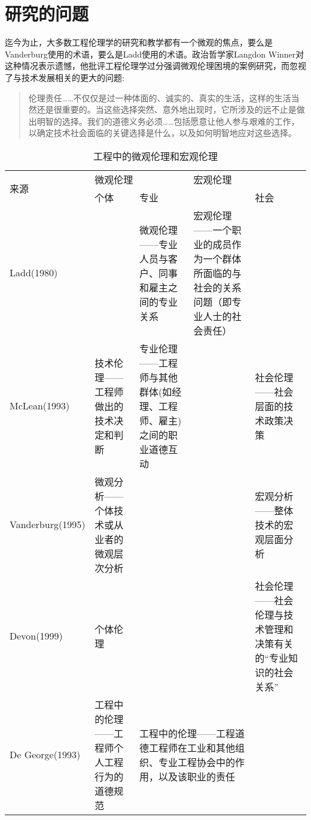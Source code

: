 \documentclass[lang=cn,11pt,a4paper]{elegantpaper}
\begin{document}
\section{研究的问题}
迄今为止，大多数工程伦理学的研究和教学都有一个微观的焦点，要么是Vanderburg使用的术语，要么是Ladd使用的术语。政治哲学家Langdon Winner\cite[p. 62]{8}对这种情况表示遗憾，他批评工程伦理学过分强调微观伦理困境的案例研究，而忽视了与技术发展相关的更大的问题:
\begin{quotation}
  伦理责任……不仅仅是过一种体面的、诚实的、真实的生活，这样的生活当然还是很重要的。当这些选择突然、意外地出现时，它所涉及的远不止是做出明智的选择。我们的道德义务必须……包括愿意让他人参与艰难的工作，以确定技术社会面临的关键选择是什么，以及如何明智地应对这些选择。
\end{quotation}


\begin{table}[htbp]

  \centering
  \caption{工程中的微观伦理和宏观伦理}
 
  \begin{tabular}{|l|p{2.5cm}|p{3cm}|p{3cm}|p{2.5cm}|}
    \hline
    \multirow{2}{*}{来源} & \multicolumn{2}{l|}{微观伦理} & \multicolumn{2}{l|}{宏观伦理} \\ \cline{2-5} 
                        & 个体          & \multicolumn{2}{l|}{专业}     & 社会          \\ \hline
    Ladd(1980)          &             & 微观伦理——专业人员与客户、同事和雇主之间的专业关系         & 宏观伦理——一个职业的成员作为一个群体所面临的与社会的关系问题（即专业人士的社会责任）          &             \\ \hline
    McLean(1993)        & 技术伦理——工程师做出的技术决定和判断          & 专业伦理——工程师与其他群体(如经理、工程师、雇主)之间的职业道德互动          &             & 社会伦理——社会层面的技术政策决策          \\ \hline
    Vanderburg(1995)    & 微观分析——个体技术或从业者的微观层次分析          &             &             & 宏观分析——整体技术的宏观层面分析          \\ \hline
    Devon(1999)         & 个体伦理          &             &             & 社会伦理——社会伦理与技术管理和决策有关的“专业知识的社会关系”          \\ \hline
    De George(1993)     & 工程中的伦理——工程师个人工程行为的道德规范          & \multicolumn{2}{p{6cm}|}{工程中的伦理——工程道德工程师在工业和其他组织、专业工程协会中的作用，以及该职业的责任}   &             \\ \hline
  \end{tabular}
\end{table}
\end{document}
